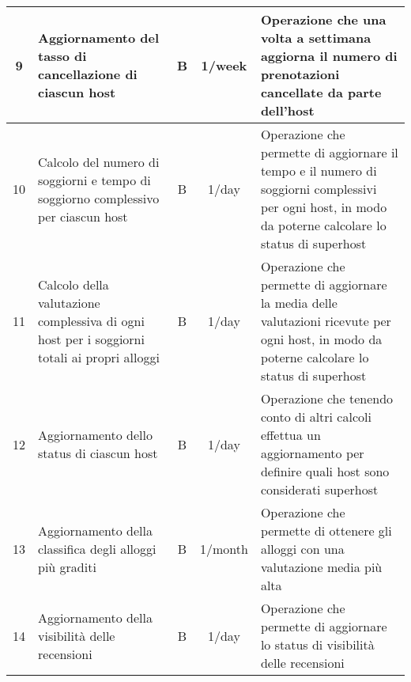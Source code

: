 \begin{longtable}{|c|p{3cm}|c|c|p{4.18cm}|}
    9         & Aggiornamento del tasso di cancellazione di ciascun host                                    & {B}           & 1/week             & Operazione che una volta a settimana aggiorna il numero di prenotazioni cancellate da parte dell'host                                                    \\\hline
    10        & Calcolo del numero di soggiorni e tempo di soggiorno complessivo per ciascun host           & {B}           & 1/day              & {Operazione che permette di aggiornare il tempo e il numero di soggiorni complessivi per ogni host, in modo da poterne calcolare lo status di superhost} \\\hline
    11        & Calcolo della valutazione complessiva di ogni host per i soggiorni totali ai propri alloggi & {B}           & 1/day              & {Operazione che permette di aggiornare la media delle valutazioni ricevute per ogni host, in modo da poterne calcolare lo status di superhost}           \\\hline
    12        & Aggiornamento dello status di ciascun host                                                  & {B}           & 1/day              & Operazione che tenendo conto di altri calcoli effettua un aggiornamento per definire quali host sono considerati superhost                               \\\hline
    13        & Aggiornamento della classifica degli alloggi più graditi                                    & {B}           & 1/month            & Operazione che permette di ottenere gli alloggi con una valutazione media più alta                                                                       \\\hline
    14        & Aggiornamento della visibilità delle recensioni                                             & {B}           & 1/day              & Operazione che permette di aggiornare lo status di visibilità delle recensioni                                                                           \\\hline
\end{longtable}
\normalsize